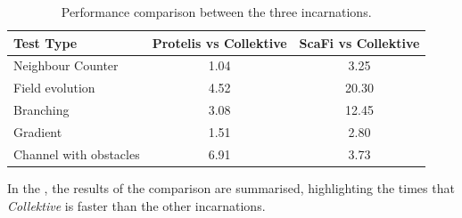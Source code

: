 \begin{table}[ht!]
    \centering
    \begin{tabular}{|l|c|c|}
        \hline
        Test Type              & Protelis vs Collektive & ScaFi vs Collektive \\ \hline
        Neighbour Counter       & 1.04                   & 3.25                \\ \hline
        Field evolution        & 4.52                   & 20.30               \\ \hline
        Branching              & 3.08                   & 12.45               \\ \hline
        Gradient               & 1.51                   & 2.80                \\ \hline
        Channel with obstacles & 6.91                   & 3.73                \\ \hline
    \end{tabular}
    \caption{Performance comparison between the three incarnations.}
    \label{tab:performance-comparison}
\end{table}

In the , the results of the comparison are summarised, highlighting the times
that \emph{Collektive} is faster than the other incarnations.
